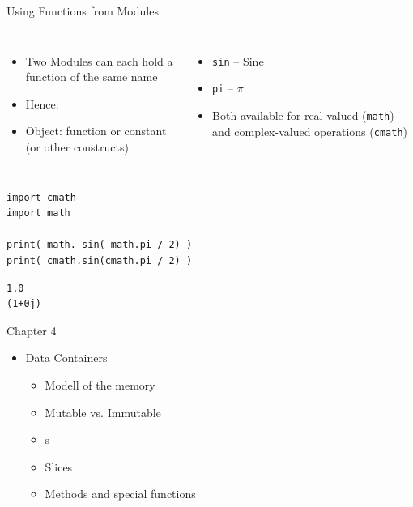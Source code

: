 \begin{frame}[fragile]{Using Functions from Modules}
%
\begin{columns}
\begin{itemize}
\item Two Modules can each hold a function of the same name
\item Hence: 
\item Object: function or constant (or other constructs)
\end{itemize}
%
\begin{itemize}
\item \texttt{sin} -- Sine
\item \texttt{pi} -- $\pi$
\item Both available for real-valued (\texttt{math}) and complex-valued operations (\texttt{cmath})
\end{itemize}
\end{columns}
%
\begin{tcbraster}[raster columns=2,
                  raster equal height,
                  nobeforeafter,
                  raster column skip=0.5cm]
\begin{codebox}
\begin{verbatim}
import cmath
import math

print( math. sin( math.pi / 2) )
print( cmath.sin(cmath.pi / 2) )
\end{verbatim}
\end{codebox}
%
\begin{cmdbox}
\begin{verbatim}
1.0
(1+0j)
\end{verbatim}
\end{cmdbox}
\end{tcbraster}
%
\end{frame}


\begin{frame}{Chapter 4}
%
\begin{itemize}
\item Data Containers
	\begin{itemize}
	\item Modell of the memory
	\item Mutable vs. Immutable
	\item {}s
	\item Slices
	\item Methods and special functions
	\end{itemize}
\end{itemize}
%
\end{frame}

